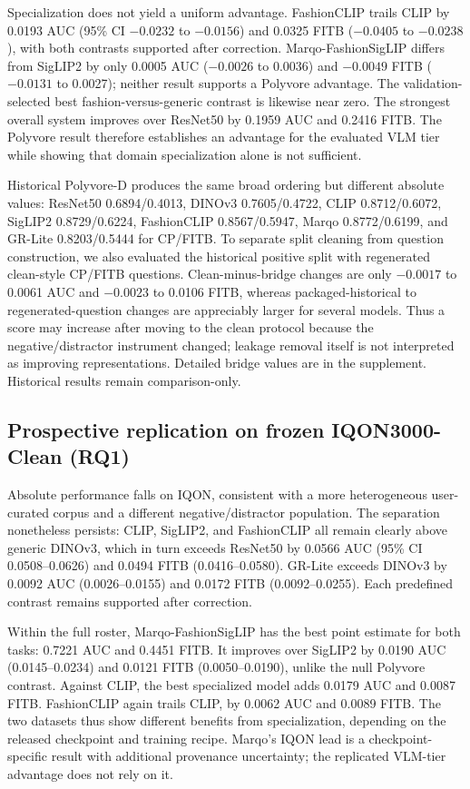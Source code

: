 \documentclass[pdflatex,sn-mathphys-num,iicol]{sn-jnl}
\begin{document}
Specialization does not yield a uniform advantage. FashionCLIP trails CLIP by 0.0193 AUC (95\% CI $-0.0232$ to $-0.0156$) and 0.0325 FITB ($-0.0405$ to $-0.0238$), with both contrasts supported after correction. Marqo-FashionSigLIP differs from SigLIP2 by only 0.0005 AUC ($-0.0026$ to 0.0036) and $-0.0049$ FITB ($-0.0131$ to 0.0027); neither result supports a Polyvore advantage. The validation-selected best fashion-versus-generic contrast is likewise near zero. The strongest overall system improves over ResNet50 by 0.1959 AUC and 0.2416 FITB. The Polyvore result therefore establishes an advantage for the evaluated VLM tier while showing that domain specialization alone is not sufficient.

Historical Polyvore-D produces the same broad ordering but different absolute values: ResNet50 0.6894/0.4013, DINOv3 0.7605/0.4722, CLIP 0.8712/0.6072, SigLIP2 0.8729/0.6224, FashionCLIP 0.8567/0.5947, Marqo 0.8772/0.6199, and GR-Lite 0.8203/0.5444 for CP/FITB. To separate split cleaning from question construction, we also evaluated the historical positive split with regenerated clean-style CP/FITB questions. Clean-minus-bridge changes are only $-0.0017$ to 0.0061 AUC and $-0.0023$ to 0.0106 FITB, whereas packaged-historical to regenerated-question changes are appreciably larger for several models. Thus a score may increase after moving to the clean protocol because the negative/distractor instrument changed; leakage removal itself is not interpreted as improving representations. Detailed bridge values are in the supplement. Historical results remain comparison-only.

\subsection{Prospective replication on frozen IQON3000-Clean (RQ1)}\label{sec:iqon}

Absolute performance falls on IQON, consistent with a more heterogeneous user-curated corpus and a different negative/distractor population. The separation nonetheless persists: CLIP, SigLIP2, and FashionCLIP all remain clearly above generic DINOv3, which in turn exceeds ResNet50 by 0.0566 AUC (95\% CI 0.0508--0.0626) and 0.0494 FITB (0.0416--0.0580). GR-Lite exceeds DINOv3 by 0.0092 AUC (0.0026--0.0155) and 0.0172 FITB (0.0092--0.0255). Each predefined contrast remains supported after correction.

Within the full roster, Marqo-FashionSigLIP has the best point estimate for both tasks: 0.7221 AUC and 0.4451 FITB. It improves over SigLIP2 by 0.0190 AUC (0.0145--0.0234) and 0.0121 FITB (0.0050--0.0190), unlike the null Polyvore contrast. Against CLIP, the best specialized model adds 0.0179 AUC and 0.0087 FITB. FashionCLIP again trails CLIP, by 0.0062 AUC and 0.0089 FITB. The two datasets thus show different benefits from specialization, depending on the released checkpoint and training recipe. Marqo's IQON lead is a checkpoint-specific result with additional provenance uncertainty; the replicated VLM-tier advantage does not rely on it.
\end{document}
